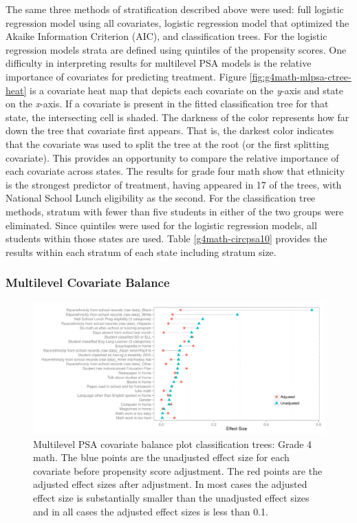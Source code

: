 \documentclass[letterpaper,12pt]{article} %
\begin{document}
The same three methods of stratification described above were used: full logistic regression model using all covariates, logistic regression model that optimized the Akaike Information Criterion (AIC), and classification trees. For the logistic regression models strata are defined using quintiles of the propensity scores. One difficulty in interpreting results for multilevel PSA models is the relative importance of covariates for predicting treatment. Figure \ref{fig:g4math-mlpsa-ctree-heat} is a covariate heat map that depicts each covariate on the \textit{y}-axis and state on the \textit{x}-axis. If a covariate is present in the fitted classification tree for that state, the intersecting cell is shaded. The darkness of the color represents how far down the tree that covariate first appears. That is, the darkest color indicates that the covariate was used to split the tree at the root (or the first splitting covariate). This provides an opportunity to compare the relative importance of each covariate across states. The results for grade four math show that ethnicity is the strongest predictor of treatment, having appeared in 17 of the trees, with National School Lunch eligibility as the second. For the classification tree methods, stratum with fewer than five students in either of the two groups were eliminated. Since quintiles were used for the logistic regression models, all students within those states are used. Table \ref{g4math-circpsa10} provides the results within each stratum of each state including stratum size.

\subsubsection{Multilevel Covariate Balance}

\setlength{\belowcaptionskip}{-10pt}
\begin{figure}[t]
\begin{center}
\includegraphics[width=\textwidth, trim=0 .2in 0 .1in]{../Figures2009/g4math-mlpsa-ctree-balance.pdf}
\caption[Multilevel PSA covariate balance plot classification trees: Grade 4 math]{Multilevel PSA covariate balance plot classification trees: Grade 4 math. The blue points are the unadjusted effect size for each covariate before propensity score adjustment. The red points are the adjusted effect sizes after adjustment. In most cases the adjusted effect size is substantially smaller than the unadjusted effect sizes and in all cases the adjusted effect sizes is less than 0.1.}
\label{fig:g4math-mlpsa-ctree-balance}
\end{center}
\end{figure}
\setlength{\belowcaptionskip}{0pt}
\end{document}
